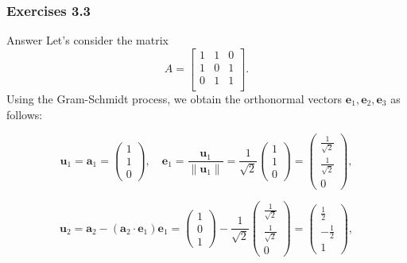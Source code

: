 \documentclass[aspectratio=169, UTF8]{ctexbeamer}
\begin{document}
\begin{frame}
    \frametitle{Exercises 3.3}
    \begin{block}{Answer}
        Let's consider the matrix
\[
A = \begin{bmatrix}
1 & 1 & 0 \\
1 & 0 & 1 \\
0 & 1 & 1 \\
\end{bmatrix}.
\]
Using the Gram-Schmidt process, we obtain the orthonormal vectors \( \mathbf{e}_1, \mathbf{e}_2, \mathbf{e}_3 \) as follows:

\[
\mathbf{u}_1 = \mathbf{a}_1 = \begin{pmatrix} 1 \\ 1 \\ 0 \end{pmatrix},
\quad
\mathbf{e}_1 = \frac{\mathbf{u}_1}{\|\mathbf{u}_1\|} = \frac{1}{\sqrt{2}} \begin{pmatrix} 1 \\ 1 \\ 0 \end{pmatrix} = \begin{pmatrix} \frac{1}{\sqrt{2}} \\ \frac{1}{\sqrt{2}} \\ 0 \end{pmatrix},
\]

\[
\mathbf{u}_2 = \mathbf{a}_2 - (\mathbf{a}_2 \cdot \mathbf{e}_1)\mathbf{e}_1 = \begin{pmatrix} 1 \\ 0 \\ 1 \end{pmatrix} - \frac{1}{\sqrt{2}}\begin{pmatrix} \frac{1}{\sqrt{2}} \\ \frac{1}{\sqrt{2}} \\ 0 \end{pmatrix} = \begin{pmatrix} \frac{1}{2} \\ -\frac{1}{2} \\ 1 \end{pmatrix},
\]
\end{block}
\end{frame}
\end{document}
